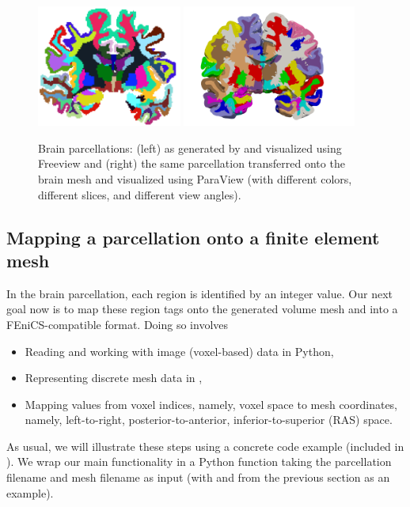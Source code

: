 \begin{figure}
\begin{center}
  \hspace{2em}
  \includegraphics[height=4cm]{./graphics/chp4/parcellation-coronalwhiteBG_2.png}
  \includegraphics[height=4cm]{./graphics/chp4/ernie32-parcellation-basic.png}
  \caption{Brain parcellations: (left) as generated by \freesurfer{} and visualized 
   using Freeview and (right) the same parcellation transferred onto the {\fenics} 
   brain mesh and visualized using ParaView (with different colors, different 
   slices, and different view angles).} 
  \label{fig:chp4:freesurfer-parc}
\end{center}
\end{figure}

\subsection{Mapping a parcellation onto a finite element mesh}
\label{sec:chp4:mapping_parcellation}
In the brain parcellation, each region is identified by an integer
value. Our next goal now is to map these region tags onto the
generated volume mesh and into a FEniCS-compatible format. Doing so
involves
\begin{itemize}
\item
  Reading and working with image (voxel-based) data in Python, 
\item
  Representing discrete mesh data in {\fenics},
\item
  Mapping values from voxel indices, namely, voxel space to mesh coordinates, %
  namely, left-to-right, posterior-to-anterior, inferior-to-superior (RAS) space.
\end{itemize} 
As usual, we will illustrate these steps using a concrete code example
(included in ). We wrap our
main functionality in a Python function
 taking the parcellation
filename and mesh filename as input (with  and
 from the previous section as an example).

